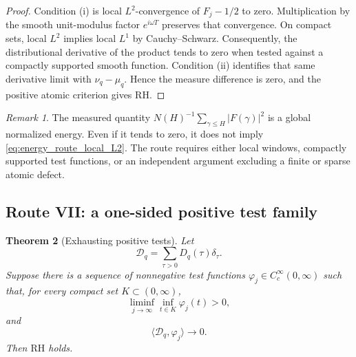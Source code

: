 \documentclass[11pt]{amsart}
\numberwithin{equation}{section}
\theoremstyle{plain}
\newtheorem{theorem}{Theorem}[section]
\theoremstyle{definition}
\theoremstyle{remark}
\newtheorem{remark}[theorem]{Remark}
\newcommand{\RH}{\mathrm{RH}}
\newcommand{\1}{\mathbf{1}}
\begin{document}
\begin{proof}
Condition (i) is local \(L^2\)-convergence of \(F_j-1/2\) to zero.
Multiplication by the smooth unit-modulus factor \(e^{i\omega T}\) preserves
that convergence.  On compact sets, local \(L^2\) implies local \(L^1\) by
Cauchy--Schwarz.  Consequently, the distributional derivative of the
product tends to zero when tested against a compactly supported smooth
function.  Condition (ii) identifies that same derivative limit with
\(\nu_q-\mu_q\).  Hence the measure difference is zero, and the positive
atomic criterion gives \(\RH\).
\end{proof}

\begin{remark}
\label{rem:global_variance_insufficient_RH_route}
The measured quantity \(N(H)^{-1}\sum_{\gamma\leq H}|F(\gamma)|^2\) is a
global normalized energy.  Even if it tends to zero, it does not imply
\eqref{eq:energy_route_local_L2}.  The route requires either local windows,
compactly supported test functions, or an independent argument excluding a
finite or sparse atomic defect.
\end{remark}

\subsection{Route VII: a one-sided positive test family}
\label{subsec:route_positive_tests}

\begin{theorem}[Exhausting positive tests]
\label{thm:exhausting_positive_tests}
Let
\begin{equation}
\mathcal D_q
=
\sum_{\tau>0}D_q(\tau)\delta_\tau.
\label{eq:positive_defect_measure_route}
\end{equation}
Suppose there is a sequence of nonnegative test functions
\(\varphi_j\in C_c^\infty(0,\infty)\) such that, for every compact set
\(K\subset(0,\infty)\),
\begin{equation}
\liminf_{j\to\infty}
\inf_{t\in K}\varphi_j(t)>0,
\label{eq:positive_tests_cover}
\end{equation}
and
\begin{equation}
\langle\mathcal D_q,\varphi_j\rangle\longrightarrow0.
\label{eq:positive_tests_vanish}
\end{equation}
Then \(\RH\) holds.
\end{theorem}
\end{document}

